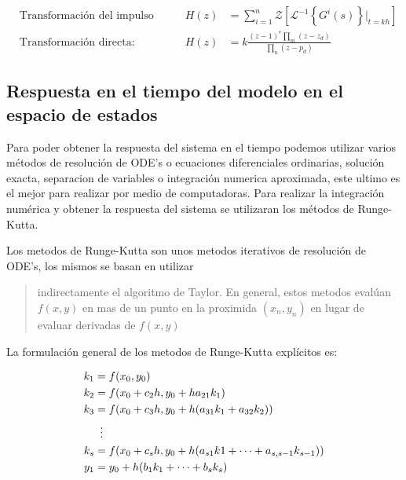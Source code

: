             \begin{align}
                &\text{Transformación del impulso invariante:}& H(z) &= \sum_{i=1}^{n}\mathcal{Z} \left[ \mathcal{L}^{-1}\left\lbrace G^{i}(s)\right\rbrace\Bigr|_{t=kh}\right] \label{eq:impulsinal}\\[15pt]
                &\text{Transformación directa:}& H(z) &=  k \frac{(z-1)^e\displaystyle\prod_m (z-z_d)}{\displaystyle\prod_n (z-p_d)} \label{eq:directa}
            \end{align}

    
    \subsection{Respuesta en el tiempo del modelo en el espacio de estados}
        
        Para poder obtener la respuesta del sistema en el tiempo podemos utilizar varios métodos de resolución de ODE's o ecuaciones diferenciales ordinarias, solución exacta, separacion de variables o integración numerica aproximada, este ultimo es el mejor para realizar por medio de computadoras. Para realizar la integración numérica y obtener la respuesta del sistema se utilizaran los métodos de Runge-Kutta.

        Los metodos de Runge-Kutta son unos metodos iterativos de resolución de ODE's, los mismos se basan en utilizar \blockquote[{\cite[p.31]{horacio1997metodos}}]{indirectamente el algoritmo de Taylor. En general, estos metodos evalúan $f(x,y)$ en mas de un punto en la proximida $(x_n,y_n)$ en lugar de evaluar derivadas de $f(x,y)$}. La formulación general de los metodos de Runge-Kutta explícitos es:
        
        \begin{equation}\label{eq:RKgeneral}
            \begin{aligned}
                k_1 &= f(x_0,y_0)\\
                k_2 &= f(x_0 + c_2 h,y_0 + ha_{21}k_1)\\
                k_3 &= f(x_0 + c_3 h,y_0 + h(a_{31}k_1 + a_{32}k_2))\\
                &\mathrel{\makebox[\widthof{=}]{\vdots}}\\
                k_s &= f(x_0 + c_s h,y_0 + h(a_{s1}k1 + \cdots +  a_{s,s-1}k_{s-1}))\\
                y_1 &= y_0 + h(b_1 k_1 + \cdots + b_s k_s)
            \end{aligned}
        \end{equation}
        
